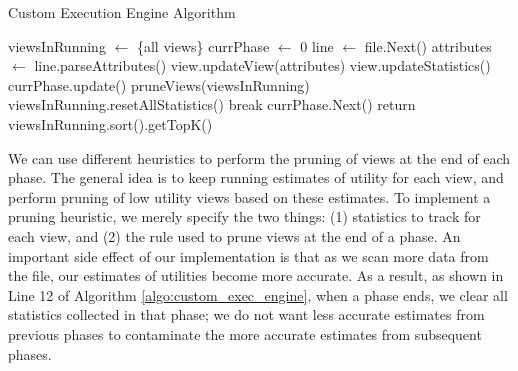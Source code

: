 

\begin{algorithm}
\caption{Custom Execution Engine Algorithm}
\label{algo:custom_exec_engine}
\begin{algorithmic}[1]
\State viewsInRunning $\gets$ \{all views\}
\State currPhase $\gets$ 0
\State line $\gets$ file.Next()
\State attributes $\gets$ line.parseAttributes()
\State view.updateView(attributes)
\State view.updateStatistics()
\EndFor
\State currPhase.update()
\State pruneViews(viewsInRunning)
\State viewsInRunning.resetAllStatistics()
\State break
\EndIf
\State currPhase.Next()
\EndIf
\EndWhile
\State return viewsInRunning.sort().getTopK()
\end{algorithmic}
\end{algorithm}

We can use different heuristics to perform the pruning of views at the end of
each phase.
The general idea is to keep running estimates of utility for each view, and
perform pruning of low utility views based on these estimates.
To implement a pruning heuristic, we merely specify the two things: (1)
statistics to track for each view, and (2) the rule used to prune views at the
end of a phase.
An important side effect of our implementation is that
as we scan more data from the file, our estimates of utilities become more
accurate.
As a result, as shown in Line 12 of Algorithm \ref{algo:custom_exec_engine},
when a phase ends, we clear all statistics collected in that phase; we do not
want less accurate estimates from previous phases to contaminate the more
accurate estimates from subsequent phases.

